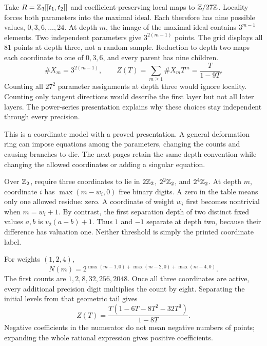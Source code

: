 Take $R=\mathbb Z_3[[t_1,t_2]]$ and coefficient-preserving local maps to $\mathbb Z/27\mathbb Z$. Locality forces both parameters into the maximal ideal. Each therefore has nine possible values, $0,3,6,\ldots,24$.
At depth $m$, the image of the maximal ideal contains $3^{m-1}$ elements. Two independent parameters give $3^{2(m-1)}$ points. The grid displays all $81$ points at depth three, not a random sample. Reduction to depth two maps each coordinate to one of $0,3,6$, and every parent has nine children.
\[
\#X_m=3^{2(m-1)},\qquad
Z(T)=\sum_{m\ge1}\#X_mT^m=\frac{T}{1-9T}.
\]
Counting all $27^2$ parameter assignments at depth three would ignore locality. Counting only tangent directions would describe the first layer but not all later layers. The power-series presentation explains why these choices stay independent through every precision.

This is a coordinate model with a proved presentation. A general deformation ring can impose equations among the parameters, changing the counts and causing branches to die. The next pages retain the same depth convention while changing the allowed coordinates or adding a singular equation.

Over $\mathbb Z_2$, require three coordinates to lie in $2\mathbb Z_2$, $2^2\mathbb Z_2$, and $2^4\mathbb Z_2$. At depth $m$, coordinate $i$ has $\max(m-w_i,0)$ free binary digits. A zero in the table means only one allowed residue: zero.
A coordinate of weight $w_i$ first becomes nontrivial when $m=w_i+1$. By contrast, the first separation depth of two distinct fixed values $a,b$ is $v_2(a-b)+1$. Thus $1$ and $-1$ separate at depth two, because their difference has valuation one. Neither threshold is simply the printed coordinate label.

For weights $(1,2,4)$,
\[
N(m)=2^{\max(m-1,0)+\max(m-2,0)+\max(m-4,0)}.
\]
The first counts are $1,2,8,32,256,2048$. Once all three coordinates are active, every additional precision digit multiplies the count by eight. Separating the initial levels from that geometric tail gives
\[
Z(T)=\frac{T(1-6T-8T^2-32T^3)}{1-8T}.
\]
Negative coefficients in the numerator do not mean negative numbers of points; expanding the whole rational expression gives positive coefficients.

